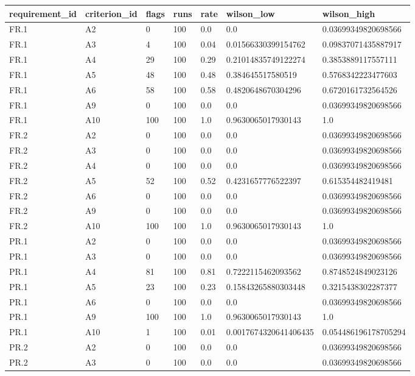\begin{tabular}{lllllll}
\hline
requirement\_id & criterion\_id & flags & runs & rate & wilson\_low & wilson\_high \\
\hline
FR.1 & A2 & 0 & 100 & 0.0 & 0.0 & 0.03699349820698566 \\
FR.1 & A3 & 4 & 100 & 0.04 & 0.01566330399154762 & 0.09837071435887917 \\
FR.1 & A4 & 29 & 100 & 0.29 & 0.21014835749122274 & 0.3853889117557111 \\
FR.1 & A5 & 48 & 100 & 0.48 & 0.384645517580519 & 0.5768342223477603 \\
FR.1 & A6 & 58 & 100 & 0.58 & 0.4820648670304296 & 0.6720161732564526 \\
FR.1 & A9 & 0 & 100 & 0.0 & 0.0 & 0.03699349820698566 \\
FR.1 & A10 & 100 & 100 & 1.0 & 0.9630065017930143 & 1.0 \\
FR.2 & A2 & 0 & 100 & 0.0 & 0.0 & 0.03699349820698566 \\
FR.2 & A3 & 0 & 100 & 0.0 & 0.0 & 0.03699349820698566 \\
FR.2 & A4 & 0 & 100 & 0.0 & 0.0 & 0.03699349820698566 \\
FR.2 & A5 & 52 & 100 & 0.52 & 0.4231657776522397 & 0.615354482419481 \\
FR.2 & A6 & 0 & 100 & 0.0 & 0.0 & 0.03699349820698566 \\
FR.2 & A9 & 0 & 100 & 0.0 & 0.0 & 0.03699349820698566 \\
FR.2 & A10 & 100 & 100 & 1.0 & 0.9630065017930143 & 1.0 \\
PR.1 & A2 & 0 & 100 & 0.0 & 0.0 & 0.03699349820698566 \\
PR.1 & A3 & 0 & 100 & 0.0 & 0.0 & 0.03699349820698566 \\
PR.1 & A4 & 81 & 100 & 0.81 & 0.7222115462093562 & 0.8748524849023126 \\
PR.1 & A5 & 23 & 100 & 0.23 & 0.15843265880303448 & 0.3215438302287377 \\
PR.1 & A6 & 0 & 100 & 0.0 & 0.0 & 0.03699349820698566 \\
PR.1 & A9 & 100 & 100 & 1.0 & 0.9630065017930143 & 1.0 \\
PR.1 & A10 & 1 & 100 & 0.01 & 0.0017674320641406435 & 0.054486196178705294 \\
PR.2 & A2 & 0 & 100 & 0.0 & 0.0 & 0.03699349820698566 \\
PR.2 & A3 & 0 & 100 & 0.0 & 0.0 & 0.03699349820698566 \\

\end{tabular}
